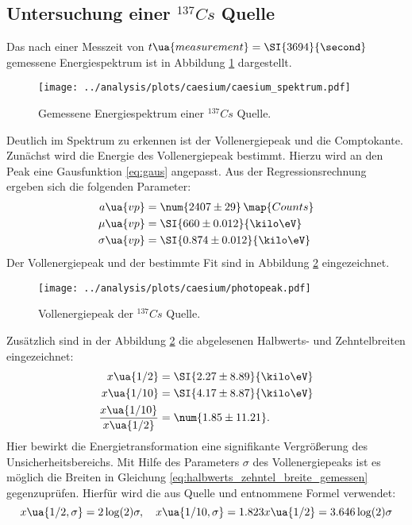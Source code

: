 \subsection{Untersuchung einer $^{137}{Cs}$ Quelle}
\FloatBarrier
Das nach einer Messzeit von $t\ua{measurement}=\SI{3694}{\second}$ gemessene
Energiespektrum ist in Abbildung \ref{fig:caesium_spektrum} dargestellt.
\begin{figure}
  \centering
  \texttt{[image: ../analysis/plots/caesium/caesium\_spektrum.pdf]}
  \caption{Gemessene Energiespektrum einer $^{137}{Cs}$ Quelle.}
  \label{fig:caesium_spektrum}
\end{figure}
Deutlich im Spektrum zu erkennen ist der Vollenergiepeak und die Comptokante.
Zunächst wird die Energie des Vollenergiepeak bestimmt. Hierzu wird an den Peak
eine Gausfunktion \eqref{eq:gaus} angepasst. Aus der Regressionsrechnung ergeben
sich die folgenden Parameter:
\begin{align*}
  a\ua{vp}&=\num{2407\pm29}\,\map{Counts}\\
  \mu\ua{vp}&=\SI{660\pm0.012}{\kilo\eV} \\
  \sigma\ua{vp}&=\SI{0.874\pm0.012}{\kilo\eV}
\end{align*}
Der Vollenergiepeak und der bestimmte Fit sind in Abbildung \ref{fig:Vollenergiepeak} eingezeichnet.
\begin{figure}
  \centering
  \texttt{[image: ../analysis/plots/caesium/photopeak.pdf]}
  \caption{Vollenergiepeak der $^{137}{Cs}$ Quelle.}
  \label{fig:Vollenergiepeak}
\end{figure}
Zusätzlich sind in der Abbildung \ref{fig:Vollenergiepeak} die abgelesenen
Halbwerts- und Zehntelbreiten eingezeichnet:
\begin{align}
  \label{eq:halbwerts_zehntel_breite_gemessen}
  x\ua{1/2}&= \SI{2.27\pm 8.89}{\kilo\eV}\\
  x\ua{1/10}&=\SI{4.17\pm8.87}{\kilo\eV} \\
  \frac{x\ua{1/10}}{x\ua{1/2}} &=\num{1.85\pm 11.21}.
\end{align}
Hier bewirkt die Energietransformation eine signifikante Vergrößerung des Unsicherheitsbereichs.
Mit Hilfe des Parameters $\sigma$ des Vollenergiepeaks ist es möglich die
Breiten in Gleichung \eqref{eq:halbwerts_zehntel_breite_gemessen} gegenzuprüfen.
Hierfür wird die aus Quelle \cite{halbwertsbreite} und \cite{anleitungv18}
entnommene Formel verwendet:
\begin{equation}
  \label{eq:formel_umrechnung}
  x\ua{1/2,\sigma}=2\log(2)\sigma, \quad x\ua{1/10,\sigma}=1.823 x\ua{1/2}=3.646\log(2)\sigma
\end{equation}
